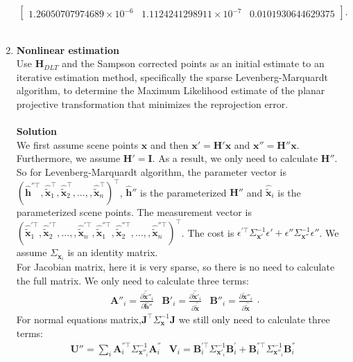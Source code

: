 \documentclass{../../assignment}
\begin{document}
\begin{problemlist}
\begin{enumerate}
\[\begin{bmatrix}
1.26050707974689 \times 10^{-6} &  1.1124241298911\times 10^{-7} & 0.0101930644629375
\end{bmatrix}.
\]
\\
\item \textbf{Nonlinear estimation}\\
Use $\mathbf{H}_{DLT}$ and the Sampson corrected points as an initial estimate to an iterative estimation method, specifically the sparse Levenberg-Marquardt algorithm, to determine the Maximum Likelihood estimate of the planar projective transformation that minimizes the reprojection error.
\\\\
\textbf{Solution}\\
We first assume scene points $\mathbf{x}$ and then $\mathbf{x}' = \mathbf{H'x}$ and $\mathbf{x}'' = \mathbf{H''x}$. Furthermore, we assume $\mathbf{H' = I}$. As a result, we only need to calculate $\mathbf{H''}$. So for Levenberg-Marquardt algorithm, the parameter vector is $(\hat{\mathbf{h}}^{''\top},\hat{\tilde{\mathbf{x}}}_1^{\top},\hat{\tilde{\mathbf{x}}}_2^{\top},...,,\hat{\tilde{\mathbf{x}}}_n^{\top})^{\top}$, $\hat{\mathbf{h}}''$ is the parameterized $\mathbf{H}''$ and $\hat{\tilde{\mathbf{x}}}_i$ is the parameterized scene points.
The measurement vector is 
$(\hat{\tilde{\mathbf{x}}}_1^{'\top},\hat{\tilde{\mathbf{x}}}_2^{'\top},...,,\hat{\tilde{\mathbf{x}}}_n^{'\top},\hat{\tilde{\mathbf{x}}}_1^{''\top},\hat{\tilde{\mathbf{x}}}_2^{''\top},...,,\hat{\tilde{\mathbf{x}}}_n^{''\top})^{\top}$. The cost is $\epsilon^{'\top}\Sigma_{\mathbf{x}'}^{-1}\epsilon' + \epsilon''\Sigma_{\mathbf{x}''}^{-1}\epsilon''$. We assume $\Sigma_{\mathbf{x}_i}$ is an identity matrix.\\
For Jacobian matrix, here it is very sparse, so there is no need to calculate the full matrix. We only need to calculate three terms:
$$
\begin{matrix}
\mathbf{A}''_i = \frac{\partial \hat{\tilde{\mathbf{x}}}''_i}{\partial \hat{\mathbf{h}}''} & 
\mathbf{B}'_i = \frac{\partial \hat{\tilde{\mathbf{x}}}'_i}{\partial \hat{\tilde{\mathbf{x}}}} & 
\mathbf{B}''_i = \frac{\partial \hat{\tilde{\mathbf{x}}}''_i}{\partial \hat{\tilde{\mathbf{x}}}}
\end{matrix}.
$$
For normal equations matrix,$\mathbf{J}^{\top}\Sigma_{\mathbf{x}}^{-1}\mathbf{J}$ we still only need to calculate three terms:
$$
\begin{matrix}
\mathbf{U}'' = \sum_i \mathbf{A}_i^{''\top}\Sigma_{\mathbf{x}''_i}^{-1}  \mathbf{A}_i^{''} 
& 
\mathbf{V}_i = \mathbf{B}_i^{'\top}\Sigma_{\mathbf{x}'_i}^{-1}  \mathbf{B}_i^{'} + \mathbf{B}_i^{''\top}\Sigma_{\mathbf{x}''_i}^{-1}  \mathbf{B}_i^{''}

\end{matrix}$$
\end{enumerate}
\end{problemlist}
\end{document}
